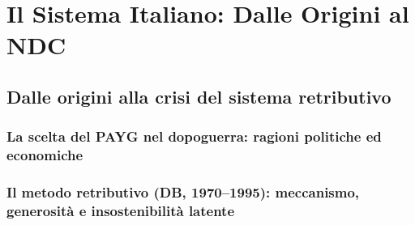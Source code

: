 \chapter{Il Sistema Italiano: Dalle Origini al NDC}


\section{Dalle origini alla crisi del sistema retributivo}

    \subsection{La scelta del PAYG nel dopoguerra:
                ragioni politiche ed economiche}
    \subsection{Il metodo retributivo (DB, 1970--1995):
                meccanismo, generosità e insostenibilità latente}

